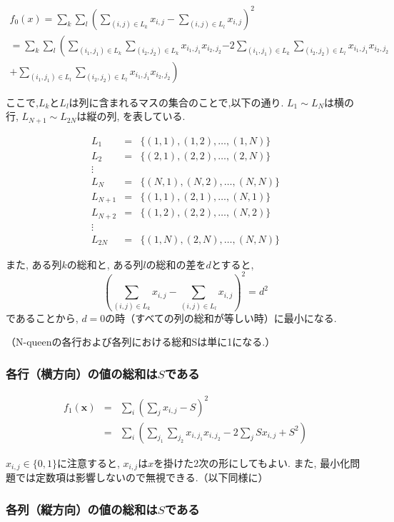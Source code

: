 \documentclass[uplatex,dvipdfmx,a4paper,11pt,oneside,openany]{jsbook}
\begin{document}
\begin{multline}
f_0(x)=\sum_k\sum_l\left(\sum_{(i,j)\in L_k} x_{i,j} - \sum_{(i,j)\in L_l} x_{i,j}\right)^2\\=\sum_k\sum_l\left(\sum_{(i_1,j_1)\in L_k}\sum_{(i_2,j_2)\in L_k} x_{i_1,j_1}x_{i_2,j_2}\right.\left.-2\sum_{(i_1,j_1)\in L_k}\sum_{(i_2,j_2)\in L_l} x_{i_1,j_1}x_{i_2,j_2}\right.\\\left.
+\sum_{(i_1,j_1)\in L_l}\sum_{(i_2,j_2)\in L_l} x_{i_1,j_1}x_{i_2,j_2}\right) \nonumber
\end{multline}

ここで,$L_k$と$L_l$は列に含まれるマスの集合のことで,以下の通り. $L_1 \sim L_{N}$は横の行, $L_{N+1} \sim L_{2N}$は縦の列, を表している.

\begin{eqnarray*}
L_1 &=& \{(1,1),(1,2),\dots,(1,N)\}\\
L_2 &=& \{(2,1),(2,2),\dots,(2,N)\}\\
\vdots\\
L_{N} &=& \{(N,1),(N,2),\dots,(N,N)\}\\
L_{N+1} &=& \{(1,1),(2,1),\dots,(N,1)\}\\
L_{N+2} &=& \{(1,2),(2,2),\dots,(N,2)\}\\
\vdots\\
L_{2N} &=& \{(1,N),(2,N),\dots,(N,N)\}
\end{eqnarray*}

また, ある列$k$の総和と, ある列$l$の総和の差を$d$とすると,
\[
\left(\sum_{(i,j)\in L_{k}} x_{i,j} - \sum_{(i,j)\in L_{l}}x_{i,j} \right)^2 = d^2
\]
であることから, $d=0$の時（すべての列の総和が等しい時）に最小になる.

（N-queenの各行および各列における総和Sは単に1になる.）

\subsubsection{各行（横方向）の値の総和は$S$である}

\begin{eqnarray*}
f_1(\bm{x})&=&\sum_i\left(\sum_jx_{i,j}-S\right)^2\\
&=&\sum_i\left(\sum_{j_1}\sum_{j_2}x_{i,j_1}x_{i,j_2} - 2 \sum_j S x_{i,j} + S^2\right)
\end{eqnarray*}

$x_{i,j}\in \{0,1\}$に注意すると, $x_{i,j}$は$x$を掛けた2次の形にしてもよい. また,
最小化問題では定数項は影響しないので無視できる.（以下同様に）

\subsubsection{各列（縦方向）の値の総和は$S$である}
\end{document}

